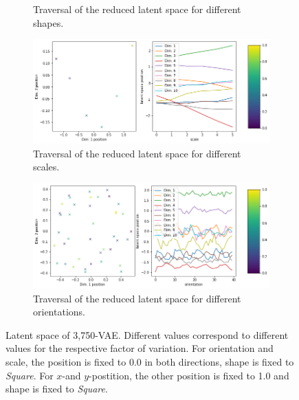 \begin{figure}[H]
\begin{subfigure}{.48\textwidth}
        \caption{Traversal of the reduced latent space for different shapes.}
    \end{subfigure}
    \begin{subfigure}{.48\textwidth}
        \includegraphics[width=\textwidth]{images/latent_space_traversals/vae_3750_dsprites_latent_space_values_scale.png}
        \caption{Traversal of the reduced latent space for different scales.}
    \end{subfigure}
    \begin{subfigure}{.48\textwidth}
        \includegraphics[width=\textwidth]{images/latent_space_traversals/vae_3750_dsprites_latent_space_values_orientation.png}
        \caption{Traversal of the reduced latent space for different orientations.}
    \end{subfigure}
    \caption[3,750-VAE - Latent Space Values]{Latent space of 3,750-\ac{VAE}. Different values correspond to different values for the respective factor of variation. For orientation and scale, the position is fixed to 0.0 in both directions, shape is fixed to \textit{Square}. For $x$-and $y$-postition, the other position is fixed to 1.0 and shape is fixed to \textit{Square}.}
    \label{fig:vae_dsprite_3750_latent_space_position}
\end{figure}

